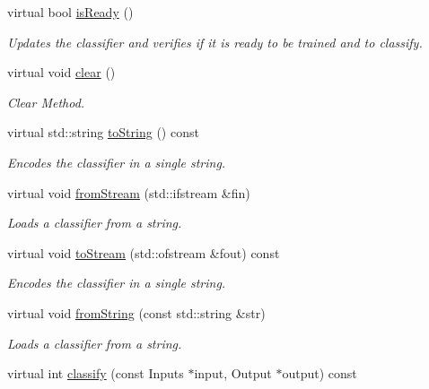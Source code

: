\begin{DoxyCompactItemize}
\item 
virtual bool \hyperlink{classiCub_1_1boostMIL_1_1SelectorClassifier_a441bfc6afb9b3b53d57823b2a8539dba}{is\+Ready} ()
\begin{DoxyCompactList}\small\item\em Updates the classifier and verifies if it is ready to be trained and to classify. \end{DoxyCompactList}\item 
virtual void \hyperlink{classiCub_1_1boostMIL_1_1SelectorClassifier_a702a26c0681aae7baa727f633a97c55e}{clear} ()
\begin{DoxyCompactList}\small\item\em Clear Method. \end{DoxyCompactList}\item 
virtual std\+::string \hyperlink{classiCub_1_1boostMIL_1_1SelectorClassifier_ab3f8bd70de704b21464496c8d9621dd4}{to\+String} () const 
\begin{DoxyCompactList}\small\item\em Encodes the classifier in a single string. \end{DoxyCompactList}\item 
virtual void \hyperlink{classiCub_1_1boostMIL_1_1SelectorClassifier_a3a72f4d8f8d1f6403ebec95dd4b14213}{from\+Stream} (std\+::ifstream \&fin)
\begin{DoxyCompactList}\small\item\em Loads a classifier from a string. \end{DoxyCompactList}\item 
virtual void \hyperlink{classiCub_1_1boostMIL_1_1SelectorClassifier_af01d7ef99e40d7e9de4ec9938640793d}{to\+Stream} (std\+::ofstream \&fout) const 
\begin{DoxyCompactList}\small\item\em Encodes the classifier in a single string. \end{DoxyCompactList}\item 
virtual void \hyperlink{classiCub_1_1boostMIL_1_1SelectorClassifier_a7eaf53adea674977466a8b71f0d7ab78}{from\+String} (const std\+::string \&str)
\begin{DoxyCompactList}\small\item\em Loads a classifier from a string. \end{DoxyCompactList}\item 
virtual int \hyperlink{classiCub_1_1boostMIL_1_1SelectorClassifier_a42a5f96736e09016e3b1e5ed89bac461}{classify} (const Inputs $\ast$input, Output $\ast$output) const 

\end{DoxyCompactItemize}

